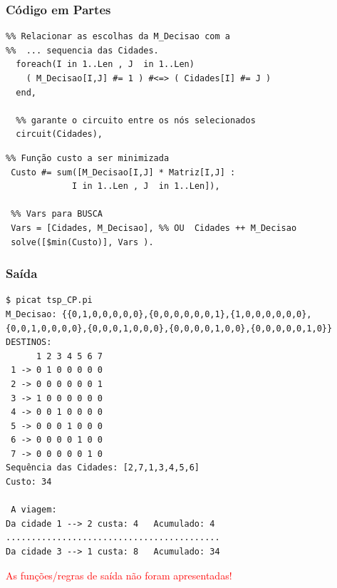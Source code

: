 \begin{frame}[fragile] 
\frametitle{Código em Partes}
\begin{footnotesize}
\begin{verbatim}
%% Relacionar as escolhas da M_Decisao com a
%%  ... sequencia das Cidades. 
  foreach(I in 1..Len , J  in 1..Len)
    ( M_Decisao[I,J] #= 1 ) #<=> ( Cidades[I] #= J )
  end,    
 
  %% garante o circuito entre os nós selecionados
  circuit(Cidades),
 \end{verbatim}
\end{footnotesize}
\pause

\begin{footnotesize}
\begin{verbatim}
%% Função custo a ser minimizada
 Custo #= sum([M_Decisao[I,J] * Matriz[I,J] : 
             I in 1..Len , J  in 1..Len]),

 %% Vars para BUSCA
 Vars = [Cidades, M_Decisao], %% OU  Cidades ++ M_Decisao
 solve([$min(Custo)], Vars ).
\end{verbatim}
\end{footnotesize}    
    
\end{frame}



\begin{frame}[fragile]
 \frametitle{Saída}

\begin{footnotesize}
\begin{verbatim}
$ picat tsp_CP.pi 
M_Decisao: {{0,1,0,0,0,0,0},{0,0,0,0,0,0,1},{1,0,0,0,0,0,0},{0,0,1,0,0,0,0},{0,0,0,1,0,0,0},{0,0,0,0,1,0,0},{0,0,0,0,0,1,0}}
DESTINOS:
      1 2 3 4 5 6 7 
 1 -> 0 1 0 0 0 0 0 
 2 -> 0 0 0 0 0 0 1 
 3 -> 1 0 0 0 0 0 0 
 4 -> 0 0 1 0 0 0 0 
 5 -> 0 0 0 1 0 0 0 
 6 -> 0 0 0 0 1 0 0 
 7 -> 0 0 0 0 0 1 0 
Sequência das Cidades: [2,7,1,3,4,5,6]
Custo: 34

 A viagem: 
Da cidade 1 --> 2 custa: 4	 Acumulado: 4
..........................................
Da cidade 3 --> 1 custa: 8	 Acumulado: 34
\end{verbatim}
\end{footnotesize}

\textcolor{red}{As funções/regras de saída não
foram apresentadas!}

\end{frame}





